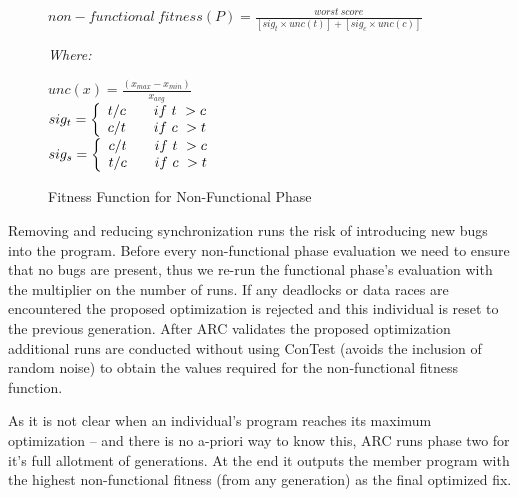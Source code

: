 \documentclass{llncs}
\begin{document}
\begin{figure}[h]
\begin{footnotesize}
\begin{center}
$non-functional\ fitness(P) = \frac{worst\ score}{[sig_t \times unc(t)] + [sig_c \times unc(c)]}$
\end{center}
\vspace{0.1cm} \textit{Where:} \vspace{0.1cm}
\end{footnotesize}
\begin{scriptsize}
\begin{center}
$unc(x) = \frac{(x_{max} - x_{min})}{x_{avg}}$ \\ \vspace{0.2cm}
$
  sig_t = \left\{
  \begin{array}{l l}
    t/c & \quad if\ t\ > c \\
    c/t & \quad if\ c\ > t \\
  \end{array} \right.
$ \\ \vspace{0.2cm}
$
  sig_s = \left\{
  \begin{array}{l l}
    c/t & \quad if\ t\ > c \\
    t/c & \quad if\ c\ > t \\
  \end{array} \right.
$ \\
\end{center}
\end{scriptsize}
\caption{Fitness Function for Non-Functional Phase}
\label{fig:nonfunctional_fitness}
\end{figure}

Removing and reducing synchronization runs the risk of introducing new bugs
into the program. Before every non-functional phase evaluation we need to
ensure that no bugs are present, thus we re-run the functional phase's
evaluation with the multiplier on the number of runs. If any deadlocks or data
races are encountered the proposed optimization is rejected and this individual
is reset to the previous generation. After ARC validates the proposed
optimization additional runs are conducted without using ConTest (avoids the
inclusion of random noise) to obtain the values required for the non-functional
fitness function.

As it is not clear when an individual's program reaches its maximum
optimization -- and there is no a-priori way to know this, ARC runs phase two
for it's full allotment of generations. At the end it outputs the member
program with the highest non-functional fitness (from any generation) as the
final optimized fix.
\end{document}
